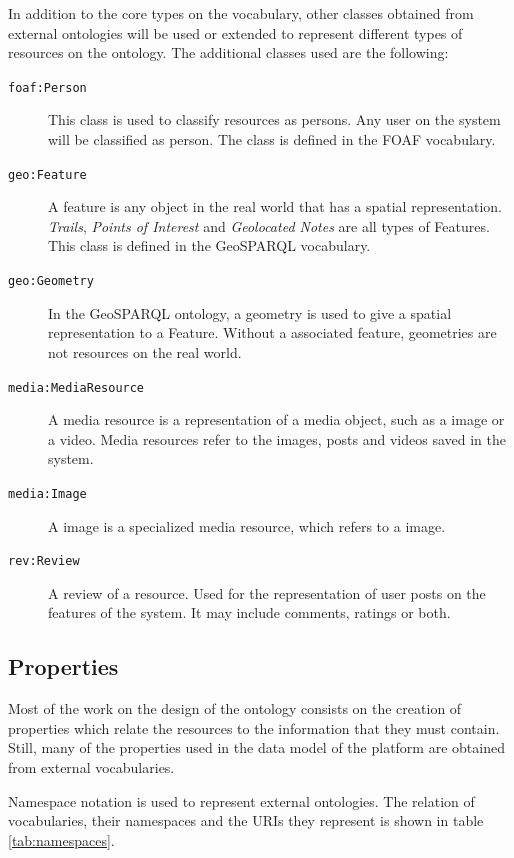 In addition to the core types on the vocabulary, other classes obtained from external ontologies will be used or extended to represent different types of resources on the ontology. The additional classes used are the following:

\begin{description}
\item[\texttt{foaf:Person}] This class is used to classify resources as persons. Any user on the system will be classified as person. The class is defined in the FOAF vocabulary.

\item[\texttt{geo:Feature}] A feature is any object in the real world that has a spatial representation. \textit{Trails}, \textit{Points of Interest} and \textit{Geolocated Notes} are all types of Features. This class is defined in the GeoSPARQL vocabulary.

\item[\texttt{geo:Geometry}] In the GeoSPARQL ontology, a geometry is used to give a spatial representation to a Feature. Without a associated feature, geometries are not resources on the real world.

\item[\texttt{media:MediaResource}] A media resource is a representation of a media object, such as a image or a video. Media resources refer to the images, posts and videos saved in the system.

\item[\texttt{media:Image}] A image is a specialized media resource, which refers to a image. 

\item[\texttt{rev:Review}] A review of a resource. Used for the representation of user posts on the features of the system. It may include comments, ratings or both.
 
\end{description}

\subsection{Properties}

Most of the work on the design of the ontology consists on the creation of properties which relate the resources to the information that they must contain. Still, many of the properties used in the data model of the platform are obtained from external vocabularies.

Namespace notation is used to represent external ontologies. The relation of vocabularies, their namespaces and the URIs they represent is shown in table \ref{tab:namespaces}.

